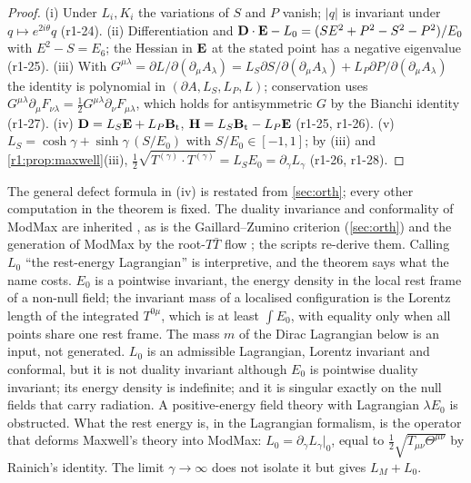 \begin{proof}
(i) Under $L_i,K_i$ the variations of $S$ and $P$ vanish; $|q|$ is invariant under $q\mapsto e^{2i\theta}q$ (r1-24). (ii) Differentiation
and $\mathbf D\cdot\mathbf E-L_0=(SE^2+P^2-S^2-P^2)/E_0$ with $E^2-S=E_6$; the Hessian in $\mathbf E$ at the stated point has a negative eigenvalue
(r1-25). (iii) With $G^{\mu\lambda}=\partial L/\partial(\partial_\mu A_\lambda)=L_S\partial S/\partial(\partial_\mu A_\lambda)+L_P\partial
P/\partial(\partial_\mu A_\lambda)$ the identity is polynomial in $(\partial A,L_S,L_P,L)$; conservation uses
$G^{\mu\lambda}\partial_\mu F_{\nu\lambda}=\tfrac12G^{\mu\lambda}\partial_\nu F_{\mu\lambda}$, which holds for antisymmetric $G$ by the
Bianchi identity (r1-27). (iv) $\mathbf D=L_S\mathbf E+L_P\mathbf B_{\rm t}$, $\mathbf H=L_S\mathbf B_{\rm t}-L_P\mathbf E$ (r1-25, r1-26). (v) $L_S=\cosh\gamma+\sinh\gamma\,(S/E_0)$
with $S/E_0\in[-1,1]$; by (iii) and \cref{r1:prop:maxwell}(iii), $\tfrac12\sqrt{T^{(\gamma)}\!\cdot T^{(\gamma)}}=L_SE_0=\partial_\gamma L_\gamma$
(r1-26, r1-28).
\end{proof}

The general defect formula in (iv) is restated from \cref{sec:orth}; every other computation in the theorem is fixed. The
duality invariance and conformality of ModMax are inherited
\cite{BandosLechnerSorokinTownsend20,Kosyakov20}, as is the Gaillard--Zumino criterion \cite{GaillardZumino81,GibbonsRasheed95} (\cref{sec:orth}) and the generation of ModMax by the root-$T\bar T$ flow \cite{BabaeiAghbolagh22}; the scripts re-derive them. Calling $L_0$
``the rest-energy Lagrangian'' is interpretive, and the theorem says what the name costs. $E_0$ is a pointwise invariant, the energy density in the
local rest frame of a non-null field; the invariant mass of a localised configuration is the Lorentz length of the integrated $T^{0\mu}$, which is at least
$\int E_0$, with equality only when all points share one rest frame. The mass $m$ of the Dirac Lagrangian below is an input, not generated. $L_0$ is an admissible Lagrangian, Lorentz invariant
and conformal, but it is not duality invariant although $E_0$ is pointwise duality invariant; its energy density is indefinite; and it is
singular exactly on the null fields that carry radiation. A positive-energy field theory with Lagrangian $\lambda E_0$ is obstructed. What the
rest energy is, in the Lagrangian formalism, is the operator that deforms Maxwell's theory into ModMax: $L_0=\partial_\gamma L_\gamma|_0$,
equal to $\tfrac12\sqrt{T_{\mu\nu}\Theta^{\mu\nu}}$ by Rainich's identity. The limit $\gamma\to\infty$ does not isolate it but gives $L_M+L_0$.


